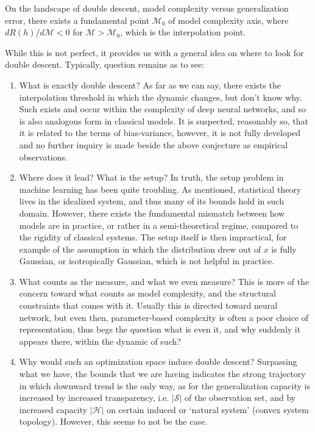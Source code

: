 \documentclass[
  journal=largetwo,
  year=2025,
  volume=37,
]{cup-journal}
\begin{document}
\begin{conjecture}
    On the landscape of double descent, model complexity versus generalization error, there exists a fundamental point $\mathcal{M}_{0}$ of model complexity axis, where $dR(h)/d\mathcal{M}< 0$ for $\mathcal{M}> \mathcal{M}_{0}$, which is the interpolation point. 
\end{conjecture}

While this is not perfect, it provides us with a general idea on where to look for double descent. Typically, question remains as to see: 

\begin{enumerate}
    \item What is exactly double descent? As far as we can say, there exists the interpolation threshold in which the dynamic changes, but don't know why. Such exists and occur within the complexity of deep neural networks, and so is also analogous form in classical models. It is suspected, reasonably so, that it is related to the terms of bias-variance, however, it is not fully developed and no further inquiry is made beside the above conjecture as empirical observations. 
    \item Where does it lead? What is the setup? In truth, the setup problem in machine learning has been quite troubling. As mentioned, statistical theory lives in the idealized system, and thus many of its bounds hold in such domain. However, there exists the fundamental mismatch between how models are in practice, or rather in a semi-theoretical regime, compared to the rigidity of classical systems. The setup itself is then impractical, for example of the assumption in which the distribution drew out of $x$ is fully Gaussian, or isotropically Gaussian, which is not helpful in practice. 
    \item What counts as the measure, and what we even measure? This is more of the concern toward what counts as model complexity, and the structural constraints that comes with it. Usually this is directed toward neural network, but even then, parameter-based complexity is often a poor choice of representation, thus begs the question what is even it, and why suddenly it appears there, within the dynamic of such?
    \item Why would such an optimization space induce double descent? Surpassing what we have, the bounds that we are having indicates the strong trajectory in which downward trend is the only way, as for the generalization capacity is increased by increased transparency, i.e. $|\mathcal{S}|$ of the observation set, and by increased capacity $|\mathcal{H}|$ on certain induced or `natural system' (convex system topology). However, this seems to not be the case. 
\end{enumerate}
\end{document}
